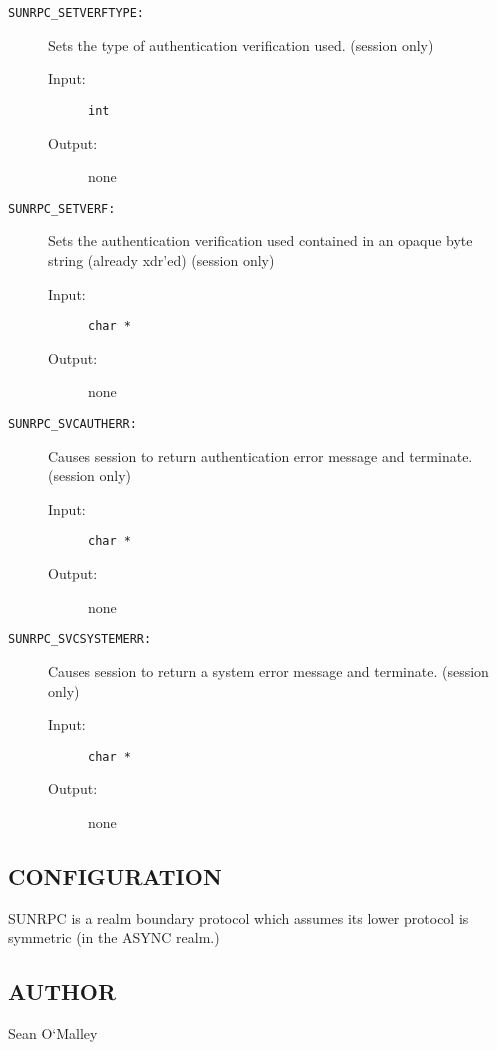 \begin{description}
\item[{\tt SUNRPC\_SETVERFTYPE:}]
Sets the type of authentication verification used.  (session only) 
\begin{description}
\item[{\rm Input:}] {\tt int  }
\item[{\rm Output:}] none
\end{description}

\item[{\tt SUNRPC\_SETVERF:}]
Sets the authentication verification used contained in an 
opaque byte string (already xdr'ed) (session only) 
\begin{description}
\item[{\rm Input:}] {\tt char *   }
\item[{\rm Output:}] none
\end{description}

\item[{\tt SUNRPC\_SVCAUTHERR:}]
Causes session to return authentication error message and 
terminate.  (session only) 
\begin{description}
\item[{\rm Input:}] {\tt char *   }
\item[{\rm Output:}] none
\end{description}

\item[{\tt SUNRPC\_SVCSYSTEMERR:}]
Causes session to return a system error message and 
terminate.  (session only) 
\begin{description}
\item[{\rm Input:}] {\tt char *   }
\item[{\rm Output:}] none
\end{description}

\end{description}

\subsection*{CONFIGURATION}

SUNRPC is a realm
boundary protocol which assumes
its lower protocol is symmetric (in the ASYNC realm.)


\subsection*{AUTHOR}

\noindent Sean O`Malley
